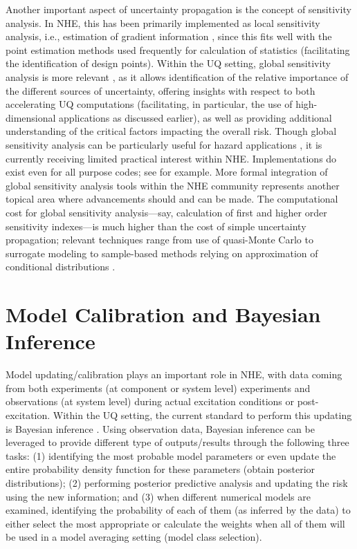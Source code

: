 Another important aspect of uncertainty propagation is the concept of sensitivity analysis. In NHE, this has been primarily implemented as local sensitivity analysis, i.e., estimation of gradient information \citep{haukaas2007methods, gu2009finite}, since this fits well with the point estimation methods used frequently for calculation of statistics (facilitating the identification of design points). Within the UQ setting, global sensitivity analysis is more relevant \citep{sobol1990sensitivity, saltelli2002making, rahman2016fsensitivity}, as it allows identification of the relative importance of the different sources of uncertainty, offering insights with respect to both accelerating UQ computations (facilitating, in particular, the use of high-dimensional applications as discussed earlier), as well as providing additional understanding of the critical factors impacting the overall risk. Though global sensitivity analysis can be particularly useful for hazard applications \citep{vetter2012global}, it is currently receiving limited practical interest within NHE. Implementations do exist even for all purpose codes; see \citet{bourinet2009review} for example. More formal integration of global sensitivity analysis tools within the NHE community represents another topical area where advancements should and can be made. The computational cost for global sensitivity analysis---say, calculation of first and higher order sensitivity indexes---is much higher than the cost of simple uncertainty propagation; relevant techniques range from use of quasi-Monte Carlo \citep{saltelli2002making} to surrogate modeling \citep{sudret2008global} to sample-based methods relying on approximation of conditional distributions \citep{li2016efficient, hu2019probability}.  

\section{Model Calibration and Bayesian Inference}
\label{sec:uq_calibration}

Model updating/calibration plays an important role in NHE, with data coming from both experiments (at component or system level) experiments and observations (at system level) during actual excitation conditions or post-excitation. Within the UQ setting, the current standard to perform this updating is Bayesian inference \citep{beck2010bayesian, kontoroupi2017online}. Using observation data, Bayesian inference can be leveraged to provide different type of outputs/results \citep{beck2013prior} through the following three tasks: (1) identifying the most probable model parameters or even update the entire probability density function for these parameters (obtain posterior distributions); (2) performing posterior predictive analysis and updating the risk using the new information; and (3) when different numerical models are examined, identifying the probability of each of them (as inferred by the data) to either select the most appropriate or calculate the weights when all of them will be used in a model averaging setting (model class selection).

